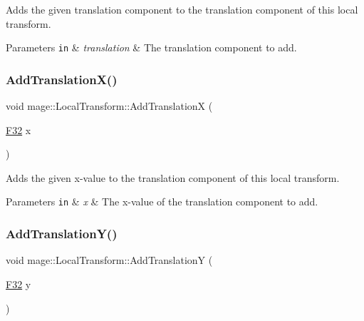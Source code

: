 Adds the given translation component to the translation component of this local transform.


\begin{DoxyParams}[1]{Parameters}
\mbox{\tt in}  & {\em translation} & The translation component to add. \\
\hline
\end{DoxyParams}
\mbox{\label{classmage_1_1_local_transform_aa1e2f6f7db150734e6f10a9d695202d7}} 
\subsubsection{\texorpdfstring{Add\+Translation\+X()}{AddTranslationX()}}
{\footnotesize\ttfamily void mage\+::\+Local\+Transform\+::\+Add\+TranslationX (\begin{DoxyParamCaption}\item[{\mbox{\hyperlink{namespacemage_aa97e833b45f06d60a0a9c4fc22ae02c0}{F32}}}]{x }\end{DoxyParamCaption})\hspace{0.3cm}{\ttfamily [noexcept]}}

Adds the given x-\/value to the translation component of this local transform.


\begin{DoxyParams}[1]{Parameters}
\mbox{\tt in}  & {\em x} & The x-\/value of the translation component to add. \\
\hline
\end{DoxyParams}
\mbox{\label{classmage_1_1_local_transform_a3e058e92d72b6709957712a7d808a6e5}} 
\subsubsection{\texorpdfstring{Add\+Translation\+Y()}{AddTranslationY()}}
{\footnotesize\ttfamily void mage\+::\+Local\+Transform\+::\+Add\+TranslationY (\begin{DoxyParamCaption}\item[{\mbox{\hyperlink{namespacemage_aa97e833b45f06d60a0a9c4fc22ae02c0}{F32}}}]{y }\end{DoxyParamCaption})\hspace{0.3cm}{\ttfamily [noexcept]}}

